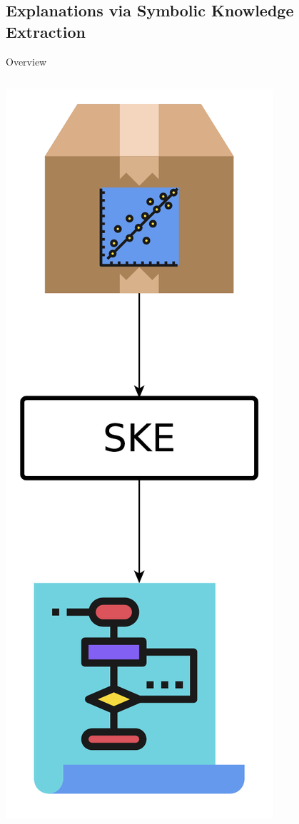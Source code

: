 \documentclass[presentation]{beamer}\mode<presentation>{\usetheme{AMSBolognaFC}}
\begin{document}
\subsection{Explanations via Symbolic Knowledge Extraction}

\begin{frame}[allowframebreaks]{Overview}
    \begin{columns}
        \begin{column}{0.19\linewidth}
            \includegraphics[width=\linewidth]{figures/ske.pdf}

\end{column}
\end{columns}
\end{frame}
\end{document}
